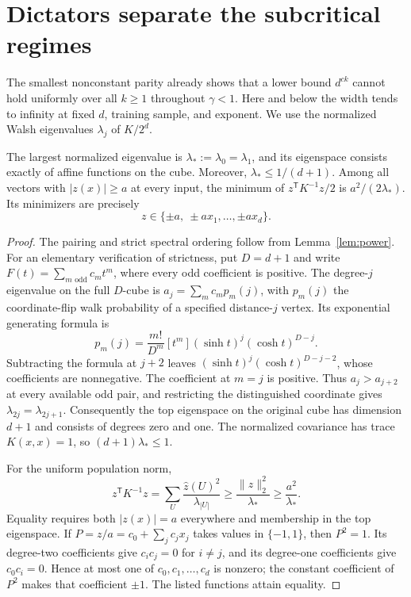 \section{Dictators separate the subcritical regimes}
\label{sec:dictators}
The smallest nonconstant parity already shows that a lower bound
$d^{c k}$ cannot hold uniformly over all $k\ge1$ throughout
$\gamma<1$. Here and below the width tends to infinity at fixed
$d$, training sample, and exponent. We use the normalized Walsh
eigenvalues $\lambda_j$ of $K/2^d$.

\begin{lemma}\label{lem:dictator-ground}
The largest normalized eigenvalue is
$\lambda_*:=\lambda_0=\lambda_1$, and its eigenspace consists
exactly of affine functions on the cube. Moreover,
$\lambda_*\le1/(d+1)$. Among all vectors with $|z(x)|\ge a$
at every input, the minimum of $z^{\mathsf T}K^{-1}z/2$ is
$a^2/(2\lambda_*)$. Its minimizers are precisely
\[
 z\in\{\pm a,\ \pm a x_1,\ldots,\pm a x_d\}.
\]
\end{lemma}
\begin{proof}
The pairing and strict spectral ordering follow from
Lemma~\ref{lem:power}. For an elementary verification of strictness,
put $D=d+1$ and write $F(t)=\sum_{m\text{ odd}}c_mt^m$, where
every odd coefficient is positive. The degree-$j$ eigenvalue on the
full $D$-cube is $a_j=\sum_m c_mp_m(j)$, with $p_m(j)$ the
coordinate-flip walk probability of a specified distance-$j$ vertex.
Its exponential generating formula is
\[
 p_m(j)=\frac{m!}{D^m}[t^m](\sinh t)^j(\cosh t)^{D-j}.
\]
Subtracting the formula at $j+2$ leaves
$(\sinh t)^j(\cosh t)^{D-j-2}$, whose coefficients are
nonnegative. The coefficient at $m=j$ is positive. Thus
$a_j>a_{j+2}$ at every available odd pair, and restricting the
distinguished coordinate gives $\lambda_{2j}=\lambda_{2j+1}$.
Consequently the top eigenspace on the original cube has dimension
$d+1$ and consists of degrees zero and one. The normalized covariance
has trace $K(x,x)=1$, so $(d+1)\lambda_*\le1$.

For the uniform population norm,
\[
 z^{\mathsf T}K^{-1}z
 =\sum_U\frac{\widehat z(U)^2}{\lambda_{|U|}}
 \ge\frac{\|z\|_2^2}{\lambda_*}
 \ge\frac{a^2}{\lambda_*}.
\]
Equality requires both $|z(x)|=a$ everywhere and membership in the
top eigenspace. If $P=z/a=c_0+\sum_jc_jx_j$ takes values in
$\{-1,1\}$, then $P^2=1$. Its degree-two coefficients give
$c_ic_j=0$ for $i\ne j$, and its degree-one coefficients give
$c_0c_i=0$. Hence at most one of $c_0,c_1,\ldots,c_d$ is nonzero;
the constant coefficient of $P^2$ makes that coefficient $\pm1$.
The listed functions attain equality.
\end{proof}

